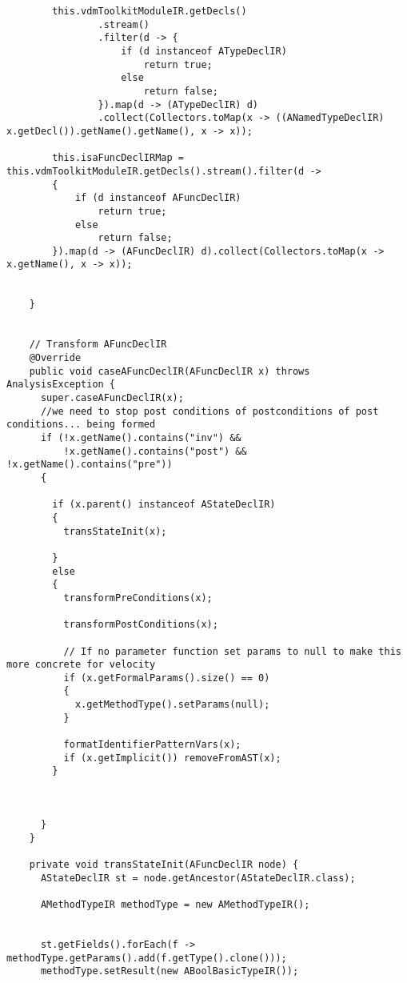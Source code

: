 \begin{appendices}
\begin{lstlisting}
        this.vdmToolkitModuleIR.getDecls()
                .stream()
                .filter(d -> {
                    if (d instanceof ATypeDeclIR)
                        return true;
                    else
                        return false;
                }).map(d -> (ATypeDeclIR) d)
                .collect(Collectors.toMap(x -> ((ANamedTypeDeclIR) x.getDecl()).getName().getName(), x -> x));
        
        this.isaFuncDeclIRMap = this.vdmToolkitModuleIR.getDecls().stream().filter(d ->
        {
            if (d instanceof AFuncDeclIR)
                return true;
            else
                return false;
        }).map(d -> (AFuncDeclIR) d).collect(Collectors.toMap(x -> x.getName(), x -> x));

        
    }
    
   
    // Transform AFuncDeclIR
    @Override
    public void caseAFuncDeclIR(AFuncDeclIR x) throws AnalysisException {
      super.caseAFuncDeclIR(x);
      //we need to stop post conditions of postconditions of post conditions... being formed
      if (!x.getName().contains("inv") && 
          !x.getName().contains("post") && !x.getName().contains("pre"))
      {
        
        if (x.parent() instanceof AStateDeclIR)
        {
          transStateInit(x);
          
        }
        else 
        {
          transformPreConditions(x);
          
          transformPostConditions(x);
          
          // If no parameter function set params to null to make this more concrete for velocity
          if (x.getFormalParams().size() == 0) 
          {
            x.getMethodType().setParams(null);
          }
          
          formatIdentifierPatternVars(x);
          if (x.getImplicit()) removeFromAST(x);
        }
      
      
      
      }
    }
    
    private void transStateInit(AFuncDeclIR node) {
      AStateDeclIR st = node.getAncestor(AStateDeclIR.class);
      
      AMethodTypeIR methodType = new AMethodTypeIR();
      
      
      st.getFields().forEach(f -> methodType.getParams().add(f.getType().clone()));
      methodType.setResult(new ABoolBasicTypeIR());
      

\end{lstlisting}
\end{appendices}
